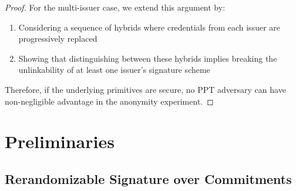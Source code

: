 \begin{proof}
\noindent For the multi-issuer case, we extend this argument by:
\begin{enumerate}
    \item Considering a sequence of hybrids where credentials from each issuer are progressively replaced
    
    \item Showing that distinguishing between these hybrids implies breaking the unlinkability of at least one issuer's signature scheme
\end{enumerate}

\noindent Therefore, if the underlying primitives are secure, no PPT adversary can have non-negligible advantage in the anonymity experiment.
\end{proof}









\section{Preliminaries}
\subsection{Rerandomizable Signature over Commitments}\label{sec:pssignature}
